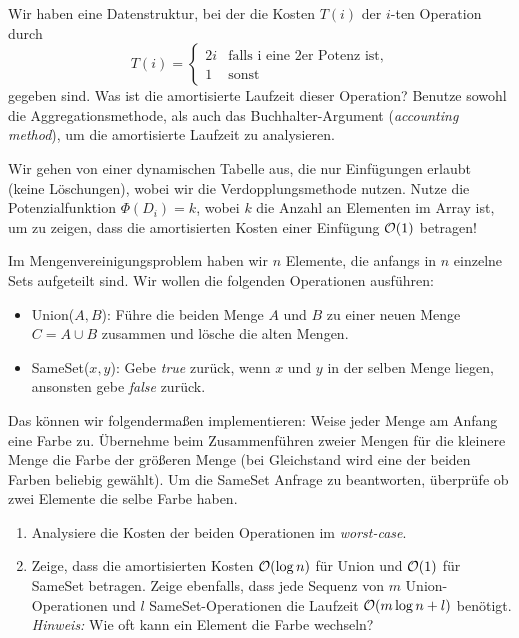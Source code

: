 \documentclass{uebung_cs}
\begin{document}
\begin{aufgabe}
	Wir haben eine Datenstruktur, bei der die Kosten $T(i)$ der $i$-ten Operation durch 
	$$T(i) = \begin{cases} 2i & \text{falls i eine 2er Potenz ist}, \\ 1 & \text{sonst} \end{cases}$$ 
	gegeben sind.
	Was ist die amortisierte Laufzeit dieser Operation? Benutze sowohl die Aggregationsmethode, als auch das Buchhalter-Argument (\textit{accounting method}), um die amortisierte Laufzeit zu analysieren.
\end{aufgabe}    

\begin{aufgabe}
	Wir gehen von einer dynamischen Tabelle aus, die nur Einfügungen erlaubt (keine Löschungen), wobei wir die Verdopplungsmethode nutzen. Nutze die Potenzialfunktion $\Phi(D_i) = k$, wobei $k$ die Anzahl an Elementen im Array ist, um zu zeigen, dass die amortisierten Kosten einer Einfügung $\mathcal{O}(1)$ betragen!
\end{aufgabe}

\begin{aufgabe}[Mengenvereinigung]
	Im Mengenvereinigungsproblem haben wir $n$ Elemente, die anfangs in $n$ einzelne Sets aufgeteilt sind. Wir wollen die folgenden Operationen ausführen:
	\begin{itemize}
		\item Union($A,B$): Führe die beiden Menge $A$ und $B$ zu einer neuen Menge $C = A \cup B$ zusammen und lösche die alten Mengen.\\
		\item SameSet($x,y$): Gebe \textit{true} zurück, wenn $x$ und $y$ in der selben Menge liegen, ansonsten gebe \textit{false} zurück.
	\end{itemize}
	Das können wir folgendermaßen implementieren: Weise jeder Menge am Anfang eine Farbe zu. Übernehme beim Zusammenführen zweier Mengen für die kleinere Menge die Farbe der größeren Menge (bei Gleichstand wird eine der beiden Farben beliebig gewählt). Um die SameSet Anfrage zu beantworten, überprüfe ob zwei Elemente die selbe Farbe haben.
	\begin{enumerate}
		\item Analysiere die Kosten der beiden Operationen im \textit{worst-case}.\\
		\item Zeige, dass die amortisierten Kosten $\mathcal{O}(\log n)$ für Union und $\mathcal{O}(1)$ für SameSet betragen. Zeige ebenfalls, dass jede Sequenz von $m$ Union-Operationen und $l$ SameSet-Operationen die Laufzeit $\mathcal{O}(m \log n + l)$ benötigt.\\
		\textit{Hinweis:} Wie oft kann ein Element die Farbe wechseln?
	\end{enumerate}
\end{aufgabe}
\end{document}
